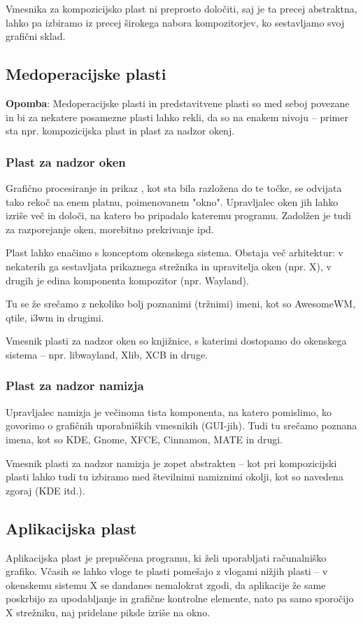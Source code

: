 \documentclass{article}
\begin{document}
Vmesnika za kompozicijsko plast ni preprosto določiti, saj je ta precej abstraktna, lahko pa izbiramo iz precej širokega nabora kompozitorjev, ko sestavljamo svoj grafični sklad.

\subsection{Medoperacijske plasti}
\textbf{Opomba}: Medoperacijske plasti in predstavitvene plasti so med seboj povezane in bi za nekatere posamezne plasti lahko rekli, da so na enakem nivoju -- primer sta npr. kompozicijska plast in plast za nadzor okenj.

\subsubsection{Plast za nadzor oken}
Grafično procesiranje in prikaz , kot sta bila razložena do te točke, se odvijata tako rekoč na enem platnu, poimenovanem "okno". Upravljalec oken jih lahko izriše več in določi, na katero bo pripadalo kateremu programu. Zadolžen je tudi za razporejanje oken, morebitno prekrivanje ipd.

Plast lahko enačimo s konceptom okenskega sistema. Obstaja več arhitektur: v nekaterih ga sestavljata prikaznega strežnika in upravitelja oken (npr. X), v drugih je edina komponenta kompozitor (npr. Wayland).

Tu se že srečamo z nekoliko bolj poznanimi (tržnimi) imeni, kot so AwesomeWM, qtile, i3wm in drugimi.

Vmesnik plasti za nadzor oken so knjižnice, s katerimi dostopamo do okenskega sistema -- npr. libwayland, Xlib, XCB in druge.

\subsubsection{Plast za nadzor namizja}
Upravljalec namizja je večinoma tista komponenta, na katero pomislimo, ko govorimo o grafičnih uporabniških vmesnikih (GUI-jih). Tudi tu srečamo poznana imena, kot so KDE, Gnome, XFCE, Cinnamon, MATE in drugi.

Vmesnik plasti za nadzor namizja je zopet abstrakten -- kot pri kompozicijski plasti lahko tudi tu izbiramo med številnimi namiznimi okolji, kot so navedena zgoraj (KDE itd.).

\subsection{Aplikacijska plast}
Aplikacijska plast je prepuščena programu, ki želi uporabljati računalniško grafiko. Včasih se lahko vloge te plasti pomešajo z vlogami nižjih plasti -- v okenskemu sistemu X se dandanes nemalokrat zgodi, da aplikacije že same poskrbijo za upodabljanje in grafične kontrolne elemente, nato pa samo sporočijo X strežniku, naj pridelane piksle izriše na okno.
\end{document}
